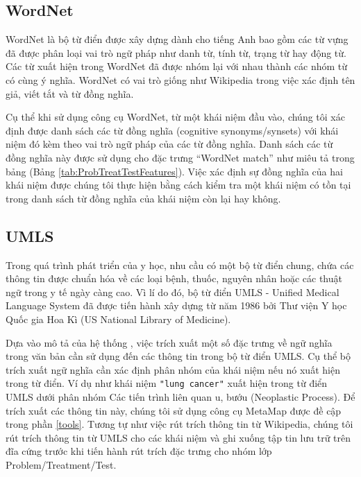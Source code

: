 \subsection*{WordNet}
WordNet là bộ từ điển được xây dựng dành cho tiếng Anh bao gồm các từ vựng đã được phân loại vai trò ngữ pháp như danh từ, tính từ, trạng từ hay động từ. Các từ xuất hiện trong WordNet đã được nhóm lại với nhau thành các nhóm từ có cùng ý nghĩa. WordNet có vai trò giống như Wikipedia trong việc xác định tên giả, viết tắt và từ đồng nghĩa.

Cụ thể khi sử dụng công cụ WordNet, từ một khái niệm đầu vào, chúng tôi xác định được danh sách các từ đồng nghĩa (cognitive synonyms/synsets) với khái niệm đó kèm theo vai trò ngữ pháp của các từ đồng nghĩa. Danh sách các từ đồng nghĩa này được sử dụng cho đặc trưng ``WordNet match'' như miêu tả trong bảng (Bảng \ref{tab:ProbTreatTestFeatures}). Việc xác định sự đồng nghĩa của hai khái niệm được chúng tôi thực hiện bằng cách kiểm tra một khái niệm có tồn tại trong danh sách từ đồng nghĩa của khái niệm còn lại hay không.

\subsection*{UMLS}
Trong quá trình phát triển của y học, nhu cầu có một bộ từ điển chung, chứa các thông tin được chuẩn hóa về các loại bệnh, thuốc, nguyên nhân hoặc các thuật ngữ trong y tế ngày càng cao. Vì lí do đó, bộ từ điển UMLS - Unified Medical Language System đã được tiến hành xây dựng từ năm 1986 bởi Thư viện Y học Quốc gia Hoa Kì (US National Library of Medicine).

Dựa vào mô tả của hệ thống \cite{YanXu2012}, việc trích xuất một số đặc trưng về ngữ nghĩa trong văn bản cần sử dụng đến các thông tin trong bộ từ điển UMLS. Cụ thể bộ trích xuất ngữ nghĩa cần xác định phân nhóm của khái niệm nếu nó xuất hiện trong từ điển. Ví dụ như khái niệm \texttt{"lung cancer"} xuất hiện trong từ điển UMLS dưới phân nhóm Các tiến trình liên quan u, bướu (Neoplastic Process). Để trích xuất các thông tin này, chúng tôi sử dụng công cụ MetaMap được đề cập trong phần \ref{tools}. Tương tự như việc rút trích thông tin từ Wikipedia, chúng tôi rút trích thông tin từ UMLS cho các khái niệm và ghi xuống tập tin lưu trữ trên đĩa cứng trước khi tiến hành rút trích đặc trưng cho nhóm lớp Problem/Treatment/Test.

